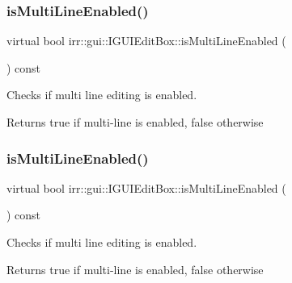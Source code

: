 \subsubsection{\texorpdfstring{is\+Multi\+Line\+Enabled()}{isMultiLineEnabled()}\hspace{0.1cm}{\footnotesize\ttfamily [1/2]}}
{\footnotesize\ttfamily virtual bool irr\+::gui\+::\+I\+G\+U\+I\+Edit\+Box\+::is\+Multi\+Line\+Enabled (\begin{DoxyParamCaption}{ }\end{DoxyParamCaption}) const\hspace{0.3cm}{\ttfamily [pure virtual]}}



Checks if multi line editing is enabled. 

\begin{DoxyReturn}{Returns}
true if multi-\/line is enabled, false otherwise 
\end{DoxyReturn}
\mbox{\label{classirr_1_1gui_1_1IGUIEditBox_a0be3338bc094fc93c9f0e4ed842835d6}} 
\subsubsection{\texorpdfstring{is\+Multi\+Line\+Enabled()}{isMultiLineEnabled()}\hspace{0.1cm}{\footnotesize\ttfamily [2/2]}}
{\footnotesize\ttfamily virtual bool irr\+::gui\+::\+I\+G\+U\+I\+Edit\+Box\+::is\+Multi\+Line\+Enabled (\begin{DoxyParamCaption}{ }\end{DoxyParamCaption}) const\hspace{0.3cm}{\ttfamily [pure virtual]}}



Checks if multi line editing is enabled. 

\begin{DoxyReturn}{Returns}
true if multi-\/line is enabled, false otherwise 
\end{DoxyReturn}
\mbox{\label{classirr_1_1gui_1_1IGUIEditBox_ae62dac299d0101be9d78ed3db9a2d314}} 
